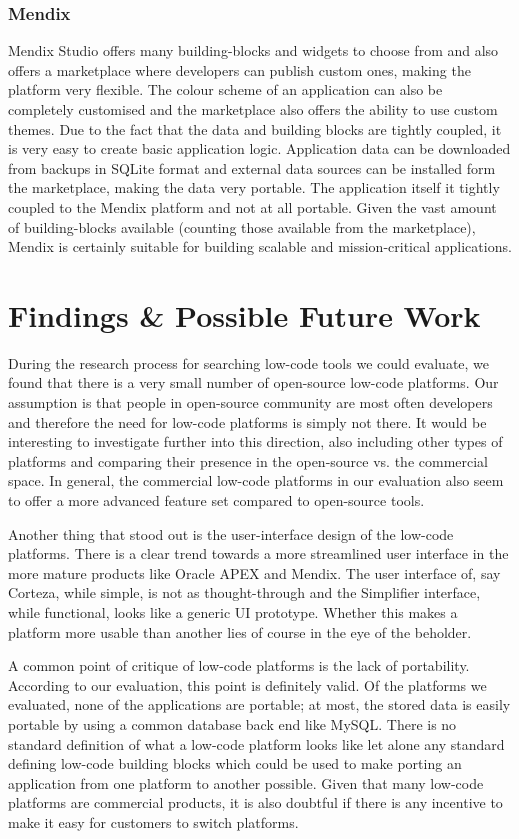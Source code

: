 \documentclass[runningheads]{llncs}
\begin{document}
\subsubsection{Mendix}

Mendix Studio offers many building-blocks and widgets to choose from and also offers a marketplace where developers can publish custom ones, making the platform very flexible. The colour scheme of an application can also be completely customised and the marketplace also offers the ability to use custom themes. Due to the fact that the data and building blocks are tightly coupled, it is very easy to create basic application logic. Application data can be downloaded from backups in SQLite format and external data sources can be installed form the marketplace, making the data very portable. The application itself it tightly coupled to the Mendix platform and not at all portable. Given the vast amount of building-blocks available (counting those available from the marketplace), Mendix is certainly suitable for building scalable and mission-critical applications.

\section{Findings \& Possible Future Work}
\label{sec:findings}

During the research process for searching low-code tools we could evaluate, we found that there is a very small number of open-source low-code platforms. Our assumption is that people in open-source community are most often developers and therefore the need for low-code platforms is simply not there. It would be interesting to investigate further into this direction, also including other types of platforms and comparing their presence in the open-source vs. the commercial space. In general, the commercial low-code platforms in our evaluation also seem to offer a more advanced feature set compared to open-source tools.

Another thing that stood out is the user-interface design of the low-code platforms. There is a clear trend towards a more streamlined user interface in the more mature products like Oracle APEX and Mendix. The user interface of, say Corteza, while simple, is not as thought-through and the Simplifier interface, while functional, looks like a generic UI prototype. Whether this makes a platform more usable than another lies of course in the eye of the beholder.

A common point of critique of low-code platforms is the lack of portability. According to our evaluation, this point is definitely valid. Of the platforms we evaluated, none of the applications are portable; at most, the stored data is easily portable by using a common database back end like MySQL. There is no standard definition of what a low-code platform looks like let alone any standard defining low-code building blocks which could be used to make porting an application from one platform to another possible. Given that many low-code platforms are commercial products, it is also doubtful if there is any incentive to make it easy for customers to switch platforms.
\end{document}
